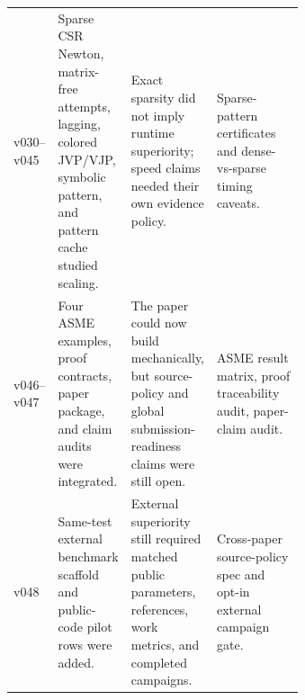 \documentclass[10pt]{article}
\begin{document}
\begin{table}[H]
\begin{tabularx}{\linewidth}{p{0.13\linewidth}p{0.23\linewidth}p{0.28\linewidth}Y}
v030--v045 & Sparse CSR Newton, matrix-free attempts, lagging, colored JVP/VJP, symbolic pattern, and pattern cache studied scaling. & Exact sparsity did not imply runtime superiority; speed claims needed their own evidence policy. & Sparse-pattern certificates and dense-vs-sparse timing caveats. \\
v046--v047 & Four ASME examples, proof contracts, paper package, and claim audits were integrated. & The paper could now build mechanically, but source-policy and global submission-readiness claims were still open. & ASME result matrix, proof traceability audit, paper-claim audit. \\
v048 & Same-test external benchmark scaffold and public-code pilot rows were added. & External superiority still required matched public parameters, references, work metrics, and completed campaigns. & Cross-paper source-policy spec and opt-in external campaign gate. \\
\bottomrule
\end{tabularx}
\end{table}
\end{document}
